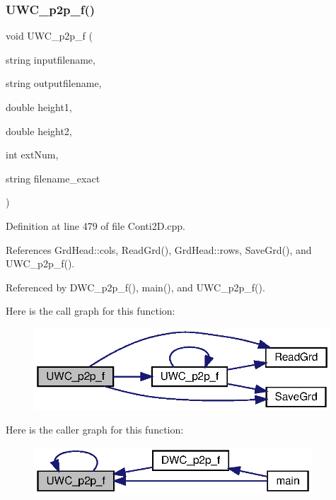\subsubsection{U\+W\+C\+\_\+p2p\+\_\+f()\hspace{0.1cm}{\footnotesize\ttfamily [1/2]}}
{\footnotesize\ttfamily void U\+W\+C\+\_\+p2p\+\_\+f (\begin{DoxyParamCaption}\item[{string}]{inputfilename,  }\item[{string}]{outputfilename,  }\item[{double}]{height1,  }\item[{double}]{height2,  }\item[{int}]{ext\+Num,  }\item[{string}]{filename\+\_\+exact }\end{DoxyParamCaption})}



Definition at line 479 of file Conti2\+D.\+cpp.



References Grd\+Head\+::cols, Read\+Grd(), Grd\+Head\+::rows, Save\+Grd(), and U\+W\+C\+\_\+p2p\+\_\+f().



Referenced by D\+W\+C\+\_\+p2p\+\_\+f(), main(), and U\+W\+C\+\_\+p2p\+\_\+f().

Here is the call graph for this function\+:
\nopagebreak
\begin{figure}[H]
\begin{center}
\leavevmode
\includegraphics[width=314pt]{Conti2D_8h_af82757cb7e0f4f398e774b4e89b9ea72_af82757cb7e0f4f398e774b4e89b9ea72_cgraph}
\end{center}
\end{figure}
Here is the caller graph for this function\+:\nopagebreak
\begin{figure}[H]
\begin{center}
\leavevmode
\includegraphics[width=295pt]{Conti2D_8h_af82757cb7e0f4f398e774b4e89b9ea72_af82757cb7e0f4f398e774b4e89b9ea72_icgraph}
\end{center}
\end{figure}
\mbox{\label{Conti2D_8h_a016dc620865e33635aabc81c129eac30_a016dc620865e33635aabc81c129eac30}} 
